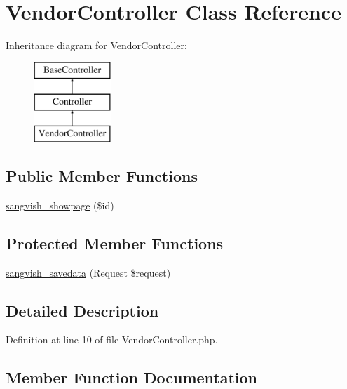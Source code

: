 \hypertarget{class_responsive_1_1_http_1_1_controllers_1_1_vendor_controller}{}\section{Vendor\+Controller Class Reference}
\label{class_responsive_1_1_http_1_1_controllers_1_1_vendor_controller}
Inheritance diagram for Vendor\+Controller\+:\begin{figure}[H]
\begin{center}
\leavevmode
\includegraphics[height=3.000000cm]{class_responsive_1_1_http_1_1_controllers_1_1_vendor_controller}
\end{center}
\end{figure}
\subsection*{Public Member Functions}
\begin{DoxyCompactItemize}
\item 
\mbox{\hyperlink{class_responsive_1_1_http_1_1_controllers_1_1_vendor_controller_a25c26d79ff97b25376137ed6c25cab21}{sangvish\+\_\+showpage}} (\$id)
\end{DoxyCompactItemize}
\subsection*{Protected Member Functions}
\begin{DoxyCompactItemize}
\item 
\mbox{\hyperlink{class_responsive_1_1_http_1_1_controllers_1_1_vendor_controller_a63d8d498a130e9f530dd9de0247a0c74}{sangvish\+\_\+savedata}} (Request \$request)
\end{DoxyCompactItemize}


\subsection{Detailed Description}


Definition at line 10 of file Vendor\+Controller.\+php.



\subsection{Member Function Documentation}
\mbox{\label{class_responsive_1_1_http_1_1_controllers_1_1_vendor_controller_a63d8d498a130e9f530dd9de0247a0c74}} 
